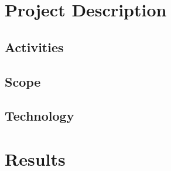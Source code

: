 \documentclass[12pt]{article}
\begin{document}
\section{Project Description}\label{sec:project}

\subsection{Activities}\label{sec:activities}

\subsection{Scope}\label{sec:scope}

\subsection{Technology}\label{sec:technology}

\section{Results}\label{sec:results}



\noindent
\nocite{*}



\end{document}

